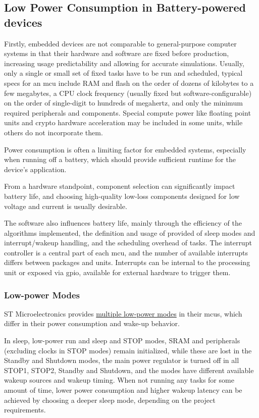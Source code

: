 \subsection{Low Power Consumption in Battery-powered devices}
Firstly, embedded devices are not comparable to general-purpose computer systems in that their hardware and software are fixed before production, increasing usage predictability and allowing for accurate simulations. 
Usually, only a single or small set of fixed tasks have to be run and scheduled, typical specs for an \gls{mcu} include RAM and flash on the order of dozens of kilobytes to a few megabytes, a CPU clock frequency (usually fixed but software-configurable) on the order of single-digit to hundreds of megahertz, and only the minimum required peripherals and components. 
Special compute power like floating point units and crypto hardware acceleration may be included in some units, while others do not incorporate them.

Power consumption is often a limiting factor for embedded systems, especially when running off a battery, which should provide sufficient runtime for the device's application. 

From a hardware standpoint, component selection can significantly impact battery life, and choosing high-quality low-loss components designed for low voltage and current is usually desirable.

The software also influences battery life, mainly through the efficiency of the algorithms implemented, the definition and usage of provided of sleep modes and interrupt/wakeup handling, and the scheduling overhead of tasks. 
The interrupt controller is a central part of each \gls{mcu}, and the number of available interrupts differs between packages and units. Interrupts can be internal to the processing unit or exposed via \gls{gpio}, available for external hardware to trigger them.

\subsubsection{Low-power Modes}
ST Microelectronics provides \href{https://wiki.st.com/stm32mcu/wiki/Getting_started_with_PWR}{multiple low-power modes} in their \gls{mcu}s, which differ in their power consumption and wake-up behavior. 

In sleep, low-power run and sleep and STOP modes, SRAM and peripherals (excluding clocks in STOP modes) remain initialized, while these are lost in the Standby and Shutdown modes, the main power regulator is turned off in all STOP1, STOP2, Standby and Shutdown, and the modes have different available wakeup sources and wakeup timing.
When not running any tasks for some amount of time, lower power consumption and higher wakeup latency can be achieved by choosing a deeper sleep mode, depending on the project requirements.

